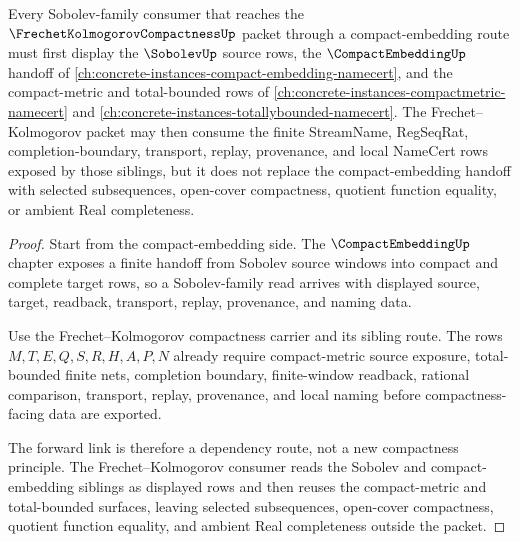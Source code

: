 \begin{theorem}
\label{thm:frechet-kolmogorov-sobolev-compact-embedding-forward-link}
Every Sobolev-family consumer that reaches the $\FrechetKolmogorovCompactnessUp$ packet through a compact-embedding route must first display the $\SobolevUp$ source rows, the $\CompactEmbeddingUp$ handoff of \autoref{ch:concrete-instances-compact-embedding-namecert}, and the compact-metric and total-bounded rows of \autoref{ch:concrete-instances-compactmetric-namecert} and \autoref{ch:concrete-instances-totallybounded-namecert}. The Frechet--Kolmogorov packet may then consume the finite StreamName, RegSeqRat, completion-boundary, transport, replay, provenance, and local NameCert rows exposed by those siblings, but it does not replace the compact-embedding handoff with selected subsequences, open-cover compactness, quotient function equality, or ambient Real completeness.
\end{theorem}
\begin{proof}
Start from the compact-embedding side. The $\CompactEmbeddingUp$ chapter exposes a finite handoff from Sobolev source windows into compact and complete target rows, so a Sobolev-family read arrives with displayed source, target, readback, transport, replay, provenance, and naming data.

Use the Frechet--Kolmogorov compactness carrier and its sibling route. The rows $M,T,E,Q,S,R,H,A,P,N$ already require compact-metric source exposure, total-bounded finite nets, completion boundary, finite-window readback, rational comparison, transport, replay, provenance, and local naming before compactness-facing data are exported.

The forward link is therefore a dependency route, not a new compactness principle. The Frechet--Kolmogorov consumer reads the Sobolev and compact-embedding siblings as displayed rows and then reuses the compact-metric and total-bounded surfaces, leaving selected subsequences, open-cover compactness, quotient function equality, and ambient Real completeness outside the packet.
\end{proof}
